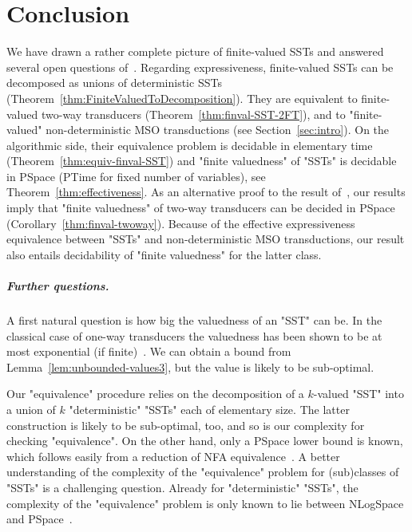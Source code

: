 \documentclass{theoretics}
\begin{document}
\section{Conclusion}\label{sec:conclusion}

We have drawn a rather complete
picture of finite-valued SSTs and answered several open questions of~\cite{DBLP:conf/icalp/AlurD11}. 
Regarding expressiveness, finite-valued SSTs can be decomposed as unions of deterministic SSTs
(Theorem~\ref{thm:FiniteValuedToDecomposition}). They are
equivalent to finite-valued two-way transducers
(Theorem~\ref{thm:finval-SST-2FT}), and to "finite-valued"
non-deterministic MSO
transductions (see Section~\ref{sec:intro}). On the algorithmic side,
their equivalence problem is decidable in elementary time
(Theorem~\ref{thm:equiv-finval-SST}) and "finite valuedness" of "SSTs" is
decidable in {\upshape\sc PSpace} ({\upshape\sc PTime} for fixed number of
variables), see Theorem~\ref{thm:effectiveness}. As an alternative proof
to the result of~\cite{YenY22}, our results imply that "finite valuedness" of
two-way transducers can be decided in
{\upshape\sc PSpace} 
(Corollary~\ref{thm:finval-twoway}). Because of the effective expressiveness
equivalence between "SSTs" and non-deterministic MSO transductions, our
result also entails decidability of "finite valuedness" for the latter
class.


\medskip
\subparagraph{\bf Further questions.}
A first natural question is how big the valuedness of an "SST" can
be.
In the classical case of one-way transducers the valuedness has been
shown to be at most exponential (if finite)~\cite{Weber93}.
We can obtain a bound from Lemma~\ref{lem:unbounded-values3}, but the
value is likely to be sub-optimal.


Our "equivalence" procedure relies on the
decomposition of a $k$-valued "SST" into a union of $k$ "deterministic"
"SSTs" each of elementary size. The latter construction is likely to
be sub-optimal, too, and so is our complexity for checking "equivalence". 
On the other hand, only a {\upshape\sc PSpace} lower bound is
known, which follows easily from a reduction of NFA equivalence~\cite{AhoHU74}. 
A better understanding of the
complexity of the "equivalence" problem for (sub)classes of "SSTs" is a
challenging question. Already for "deterministic" "SSTs", the complexity of the "equivalence" problem
is only known to lie between {\upshape\sc NLogSpace} and
{\upshape\sc PSpace}~\cite{DBLP:conf/popl/AlurC11}.
\end{document}
